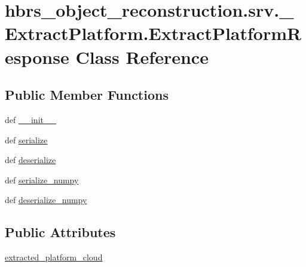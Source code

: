 \hypertarget{classhbrs__object__reconstruction_1_1srv_1_1___extract_platform_1_1_extract_platform_response}{\section{hbrs\-\_\-object\-\_\-reconstruction.\-srv.\-\_\-\-Extract\-Platform.\-Extract\-Platform\-Response \-Class \-Reference}
\label{classhbrs__object__reconstruction_1_1srv_1_1___extract_platform_1_1_extract_platform_response}
}
\subsection*{\-Public \-Member \-Functions}
\begin{DoxyCompactItemize}
\item 
def \hyperlink{classhbrs__object__reconstruction_1_1srv_1_1___extract_platform_1_1_extract_platform_response_aa275a722b5d1c769794ba41cecc688f0}{\-\_\-\-\_\-init\-\_\-\-\_\-}
\item 
def \hyperlink{classhbrs__object__reconstruction_1_1srv_1_1___extract_platform_1_1_extract_platform_response_a36ddea987134992e81493e4b45c19a5a}{serialize}
\item 
def \hyperlink{classhbrs__object__reconstruction_1_1srv_1_1___extract_platform_1_1_extract_platform_response_a52fdcbc557f04573d4d68a7783bb483c}{deserialize}
\item 
def \hyperlink{classhbrs__object__reconstruction_1_1srv_1_1___extract_platform_1_1_extract_platform_response_afa91001bd37192b3c615f892d4ec70f4}{serialize\-\_\-numpy}
\item 
def \hyperlink{classhbrs__object__reconstruction_1_1srv_1_1___extract_platform_1_1_extract_platform_response_acdbbc038b951e4ff5617b11b336838e8}{deserialize\-\_\-numpy}
\end{DoxyCompactItemize}
\subsection*{\-Public \-Attributes}
\begin{DoxyCompactItemize}
\item 
\hyperlink{classhbrs__object__reconstruction_1_1srv_1_1___extract_platform_1_1_extract_platform_response_a541133d8573de59877d757d4412cc1b1}{extracted\-\_\-platform\-\_\-cloud}
\end{DoxyCompactItemize}

